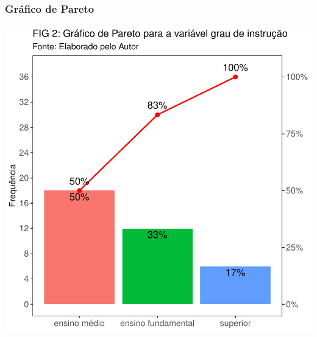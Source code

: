 \documentclass[14pt,aspectratio=1610]{beamer}
\begin{document}
\begin{frame}{}
\frametitle{Gráfico de Pareto}
\begin{block}{}
\begin{center}
\includegraphics{Aula4-pareto}
\end{center}
\end{block}
\end{frame}
\end{document}

